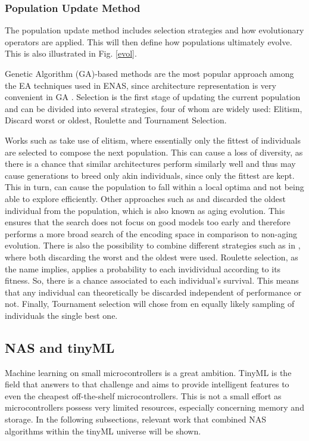 \documentclass[10pt,        %
               a4paper,     %
               journal,     %
               ]{IEEEtran}
\begin{document}
\subsubsection{Population Update Method}
\label{pop}
The population update method includes selection strategies and how evolutionary operators are applied. This will then
define how populations ultimately evolve. This is also illustrated in Fig. \ref{evol}.

Genetic Algorithm (GA)-based methods are the most popular approach among the EA techniques used in ENAS, since architecture representation is
very convenient in GA \cite{liu2021survey}. Selection is the first stage of updating the current population and can
be divided into several strategies, four of whom are widely used: Elitism, Discard worst or oldest, Roulette and
Tournament Selection.

Works such as \cite{elsken2017simple} take use of elitism, where essentially only the fittest of individuals are selected to
compose the next population. This can cause a loss of diversity, as there is a chance that similar architectures perform
similarly well and thus may cause generations to breed only akin individuals, since only the fittest are kept. This in turn,
can cause the population to fall within a local optima and not being able to explore efficiently.
Other approaches such as \cite{pmlr-v70-real17a} and \cite{zhang2019identify} discarded the oldest individual from the population,
which is also known as aging evolution. This ensures that the search does not focus on good models too early and therefore
performs a more broad search of the encoding space in comparison to non-aging evolution. There is also the possibility to
combine different strategies such as in \cite{zhu2019eena}, where both discarding the worst and the oldest were used.
Roulette selection, as the name implies, applies a probability to each invidividual according to its fitness. So, there is
a chance associated to each individual's survival. This means that any individual can theoretically be discarded independent
of performance or not. Finally, Tournament selection will chose from en equally likely sampling of individuals the single best one.

\subsection{NAS and tinyML}
\label{nasml}
Machine learning on small microcontrollers is a great ambition. TinyML is the field that answers to that challenge
and aims to provide intelligent features to even the cheapest off-the-shelf microcontrollers. This is not a
small effort as microcontrollers possess very limited resources, especially concerning memory and storage. In the following
subsections, relevant work that combined NAS algorithms within the tinyML universe will be shown.
\end{document}
